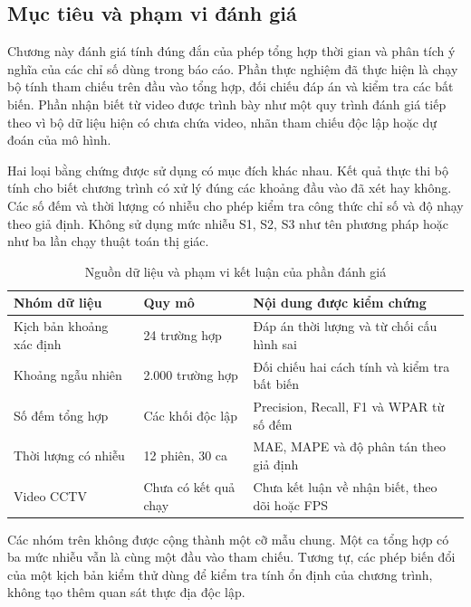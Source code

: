 \setcounter{section}{6}
\setcounter{subsection}{0}
\setcounter{subsubsection}{0}

\subsection{Mục tiêu và phạm vi đánh giá}
Chương này đánh giá tính đúng đắn của phép tổng hợp thời gian và phân tích ý nghĩa của các chỉ số dùng trong báo cáo. Phần thực nghiệm đã thực hiện là chạy bộ tính tham chiếu trên đầu vào tổng hợp, đối chiếu đáp án và kiểm tra các bất biến. Phần nhận biết từ video được trình bày như một quy trình đánh giá tiếp theo vì bộ dữ liệu hiện có chưa chứa video, nhãn tham chiếu độc lập hoặc dự đoán của mô hình.

Hai loại bằng chứng được sử dụng có mục đích khác nhau. Kết quả thực thi bộ tính cho biết chương trình có xử lý đúng các khoảng đầu vào đã xét hay không. Các số đếm và thời lượng có nhiễu cho phép kiểm tra công thức chỉ số và độ nhạy theo giả định. Không sử dụng mức nhiễu S1, S2, S3 như tên phương pháp hoặc như ba lần chạy thuật toán thị giác.

\begin{table}[H]
\centering\small
\caption{Nguồn dữ liệu và phạm vi kết luận của phần đánh giá}
\label{tab:evaluation-scope}
\begin{tabularx}{\textwidth}{p{3.1cm}p{3.1cm}X}
\toprule
Nhóm dữ liệu & Quy mô & Nội dung được kiểm chứng\\
\midrule
Kịch bản khoảng xác định & 24 trường hợp & Đáp án thời lượng và từ chối cấu hình sai\\
Khoảng ngẫu nhiên & 2.000 trường hợp & Đối chiếu hai cách tính và kiểm tra bất biến\\
Số đếm tổng hợp & Các khối độc lập & Precision, Recall, F1 và WPAR từ số đếm\\
Thời lượng có nhiễu & 12 phiên, 30 ca & MAE, MAPE và độ phân tán theo giả định\\
Video CCTV & Chưa có kết quả chạy & Chưa kết luận về nhận biết, theo dõi hoặc FPS\\
\bottomrule
\end{tabularx}
\end{table}

Các nhóm trên không được cộng thành một cỡ mẫu chung. Một ca tổng hợp có ba mức nhiễu vẫn là cùng một đầu vào tham chiếu. Tương tự, các phép biến đổi của một kịch bản kiểm thử dùng để kiểm tra tính ổn định của chương trình, không tạo thêm quan sát thực địa độc lập.


